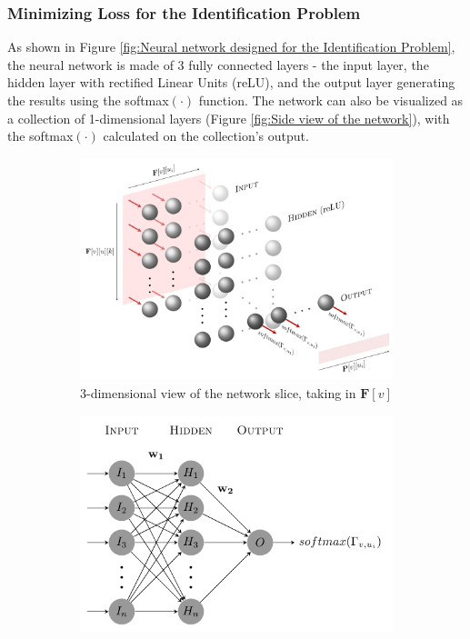 \documentclass[12pt]{article}
\newcommand{\matr}[1]{\mathbf{#1}}  %
\begin{document}
    \subsubsection{Minimizing Loss for the Identification Problem} \label{sec:Minimizing Loss for the Identification Problem}
    As shown in Figure \ref{fig:Neural network designed for the Identification Problem}, the neural network is made of 3 fully connected layers - the input layer, the hidden layer with rectified Linear Units (reLU), and the output layer generating the results using the softmax$(\cdot)$ function. The network can also be visualized as a collection of 1-dimensional layers (Figure \ref{fig:Side view of the network}), with the softmax$(\cdot)$ calculated on the collection's output.
    \begin{figure}[H]
        \begin{subfigure}{.64\textwidth}
        \includegraphics[width=\textwidth]{weights_net}
        \caption{3-dimensional view of the network slice, taking in $\matr{F}[v]$}
        \label{fig:3-dimensional view of the network slice, taking in Fv}
        \end{subfigure}
        \begin{subfigure}{.35\textwidth}
            \includegraphics[width=\textwidth]{weights_net_side}

\end{subfigure}
\end{figure}
\end{document}
